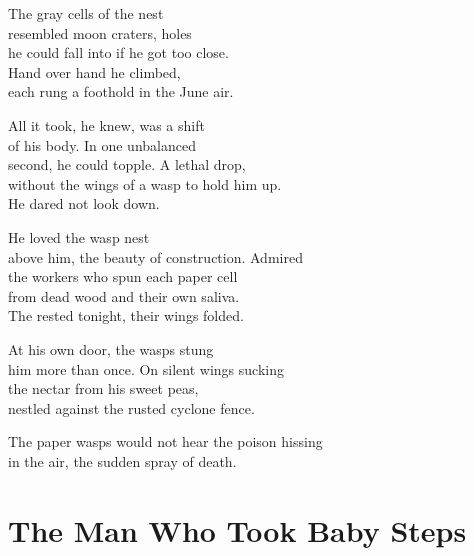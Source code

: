 \documentclass[twoside,10pt]{book}
\begin{document}
The gray cells of the nest\\
resembled moon craters, holes\\
he could fall into if he got too close.\\
Hand over hand he climbed,\\
each rung a foothold in the June air.

All it took, he knew, was a shift\\
of his body. In one unbalanced\\
second, he could topple. A lethal drop,\\
without the wings of a wasp to hold him up.\\
He dared not look down.

He loved the wasp nest\\
above him, the beauty of construction. Admired\\
the workers who spun each paper cell\\
from dead wood and their own saliva.\\
The rested tonight, their wings folded.

At his own door, the wasps stung\\
him more than once. On silent wings sucking\\
the nectar from his sweet peas,\\
nestled against the rusted cyclone fence.

The paper wasps would not hear the poison hissing\\
in the air, the sudden spray of death.


\clearpage
\section{The Man Who Took Baby Steps}
\end{document}
